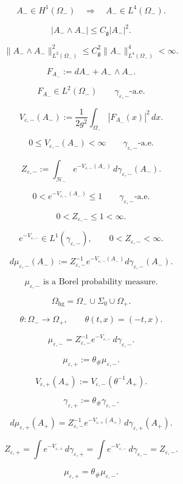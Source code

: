 \documentclass[11pt]{article}
\begin{document}
\[
A_-\in H^1(\Omega_-)
\quad\Longrightarrow\quad
A_-\in L^4(\Omega_-).
\]

\[
|A_-\wedge A_-|
\le
C_{\mathfrak g}|A_-|^2.
\]

\[
\|A_-\wedge A_-\|_{L^2(\Omega_-)}^2
\le
C_{\mathfrak g}^2
\|A_-\|_{L^4(\Omega_-)}^4
<\infty.
\]

\[
F_{A_-}:=dA_-+A_-\wedge A_-.
\]

\[
F_{A_-}\in L^2(\Omega_-)
\qquad
\gamma_{\varepsilon,-}\text{-a.e.}
\]

\[
V_{\varepsilon,-}(A_-)
:=
\frac1{2g^2}
\int_{\Omega_-}|F_{A_-}(x)|^2\,dx.
\]

\[
0\le V_{\varepsilon,-}(A_-)<\infty
\qquad
\gamma_{\varepsilon,-}\text{-a.e.}
\]

\[
Z_{\varepsilon,-}
:=
\int_{\mathcal H_-}
e^{-V_{\varepsilon,-}(A_-)}
\,d\gamma_{\varepsilon,-}(A_-).
\]

\[
0<e^{-V_{\varepsilon,-}(A_-)}\le1
\qquad
\gamma_{\varepsilon,-}\text{-a.e.}
\]

\[
0<Z_{\varepsilon,-}\le1<\infty.
\]

\[
\boxed{
e^{-V_{\varepsilon,-}}\in L^1(\gamma_{\varepsilon,-}),
\qquad
0<Z_{\varepsilon,-}<\infty.
}
\]

\[
d\mu_{\varepsilon,-}(A_-)
:=
Z_{\varepsilon,-}^{-1}
e^{-V_{\varepsilon,-}(A_-)}
d\gamma_{\varepsilon,-}(A_-).
\]

\[
\boxed{
\mu_{\varepsilon,-}
\text{ is a Borel probability measure.}
}
\]

\[
\Omega_{\mathrm{hg}}
=
\Omega_-\cup\Sigma_0\cup\Omega_+.
\]

\[
\theta:\Omega_-\to\Omega_+,
\qquad
\theta(t,x)=(-t,x).
\]

\[
\mu_{\varepsilon,-}
=
Z_{\varepsilon,-}^{-1}e^{-V_{\varepsilon,-}}\,d\gamma_{\varepsilon,-}.
\]

\[
\mu_{\varepsilon,+}
:=
\theta_\#\mu_{\varepsilon,-}.
\]

\[
V_{\varepsilon,+}(A_+)
:=
V_{\varepsilon,-}(\theta^{-1}A_+).
\]

\[
\gamma_{\varepsilon,+}
:=
\theta_\#\gamma_{\varepsilon,-}.
\]

\[
d\mu_{\varepsilon,+}(A_+)
=
Z_{\varepsilon,-}^{-1}
e^{-V_{\varepsilon,+}(A_+)}
\,d\gamma_{\varepsilon,+}(A_+).
\]

\[
Z_{\varepsilon,+}
=
\int e^{-V_{\varepsilon,+}}\,d\gamma_{\varepsilon,+}
=
\int e^{-V_{\varepsilon,-}}\,d\gamma_{\varepsilon,-}
=
Z_{\varepsilon,-}.
\]

\[
\boxed{
\mu_{\varepsilon,+}
=
\theta_\#\mu_{\varepsilon,-}.
}
\]
\end{document}
